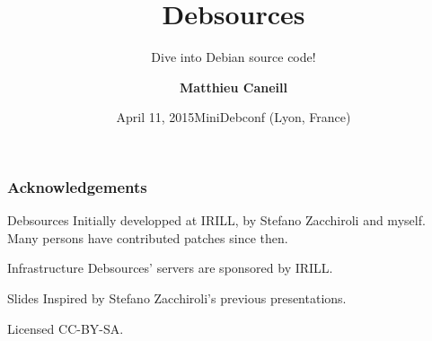 \documentclass{beamer}
\title{Debsources}
\subtitle{Dive into Debian source code!}
\author{\textbf{Matthieu Caneill}}
\institute[]{Debian contributor, PhD student at LIG}
\date[MiniDebconf, April 2015]{April 11, 2015\newline \alert{MiniDebconf} (Lyon, France)}
\begin{document}
\newcommand{\background}{
}

\background

\begin{frame}[plain]
  \titlepage  
\end{frame}

\usebackgroundtemplate{}

\begin{frame}
  \frametitle{Acknowledgements}
  
  \begin{block}{Debsources}
    Initially developped at IRILL, by Stefano Zacchiroli and
    myself. Many persons have contributed patches since then.
  \end{block}
  \pause
  \begin{block}{Infrastructure}
    Debsources' servers are sponsored by IRILL.
  \end{block}
  \pause
  \begin{block}{Slides}
    Inspired by Stefano Zacchiroli's previous presentations.

    Licensed CC-BY-SA.
  \end{block}

\end{frame}
\end{document}

